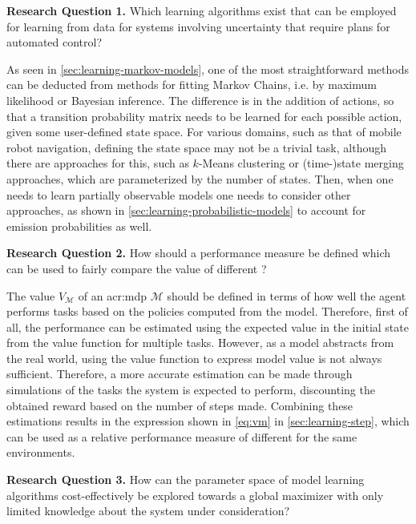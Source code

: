 \vspace{16pt}
\noindent%
\textbf{Research Question 1.} Which learning algorithms exist that can be employed for learning  from data for systems involving uncertainty that require plans for automated control?
\vspace{0pt}

As seen in \autoref{sec:learning-markov-models}, one of the most straightforward methods can be deducted from methods for fitting Markov Chains, i.e. by maximum likelihood or Bayesian inference.
The difference is in the addition of actions, so that a transition probability matrix needs to be learned for each possible action, given some user-defined state space.
For various domains, such as that of mobile robot navigation, defining the state space may not be a trivial task, although there are approaches for this, such as $k$-Means clustering or (time-)state merging approaches, which are parameterized by the number of states.
Then, when one needs to learn partially observable models one needs to consider other approaches, as shown in \autoref{sec:learning-probabilistic-models} to account for emission probabilities as well.

\vspace{16pt}
\noindent%
\textbf{Research Question 2.} How should a performance measure be defined which can be used to fairly compare the value of different ?
\vspace{12pt}

The value $V_\mathcal{M}$ of an \acrshort{acr:mdp} $\mathcal{M}$ should be defined in terms of how well the agent performs tasks based on the policies computed from the model.
Therefore, first of all, the performance can be estimated using the expected value in the initial state from the value function for multiple tasks.
However, as a model abstracts from the real world, using the value function to express model value is not always sufficient.
Therefore, a more accurate estimation can be made through simulations of the tasks the system is expected to perform, discounting the obtained reward based on the number of steps made.
Combining these estimations results in the expression shown in \autoref{eq:vm} in \autoref{sec:learning-step}, which can be used as a relative performance measure of different  for the same environments.

\vspace{16pt}
\noindent%
\textbf{Research Question 3.} How can the parameter space of model learning algorithms cost-effectively be explored towards a global maximizer with only limited knowledge about the system under consideration?
\vspace{12pt}


